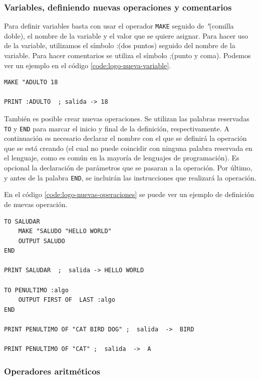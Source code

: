 \subsubsection*{Variables, definiendo nuevas operaciones y comentarios}
\label{sec:logo-variables}

Para definir variables basta con usar el operador \texttt{MAKE} seguido de \emph{"}(comilla doble), el nombre de la variable y el valor que se quiere asignar. Para hacer uso de la variable, utilizamos el símbolo \emph{:}(dos puntos) seguido del nombre de la variable. Para hacer comentarios se utiliza el símbolo \emph{;}(punto y coma). Podemos ver un ejemplo en el código \ref{code:logo-nueva-variable}. 

\begin{lstlisting}[language={Logo}, label={code:logo-nueva-variable}, caption={Ejemplo de definición de nuevas variables en el lenguaje Logo.}]
MAKE "ADULTO 18

PRINT :ADULTO  ; salida -> 18
\end{lstlisting}

También es posible crear nuevas operaciones. Se utilizan las palabras reservadas \texttt{TO} y \texttt{END} para marcar el inicio y final de la definición, respectivamente. A continuación es necesario declarar el nombre con el que se definirá la operación que se está creando (el cual no puede coincidir con ninguna palabra reservada en el lenguaje, como es común en la mayoría de lenguajes de programación). Es opcional la declaración de parámetros que se pasaran a la operación. Por último, y antes de la palabra \texttt{END}, se incluirán las instrucciones que realizará la operación.

En el código \ref{code:logo-nuevas-operaciones} se puede ver un ejemplo de definición de nuevas operación. 

\begin{lstlisting}[language={Logo}, label={code:logo-nuevas-operaciones}, caption={Definición de nuevas operaciones en el lenguaje Logo.}]
TO SALUDAR
	MAKE "SALUDO "HELLO WORLD"
	OUTPUT SALUDO
END

PRINT SALUDAR  ;  salida -> HELLO WORLD

TO PENULTIMO :algo
	OUTPUT FIRST OF  LAST :algo
END

PRINT PENULTIMO OF "CAT BIRD DOG" ;  salida  ->  BIRD

PRINT PENULTIMO OF "CAT" ;  salida  ->  A
\end{lstlisting}


\subsubsection*{Operadores aritméticos}

